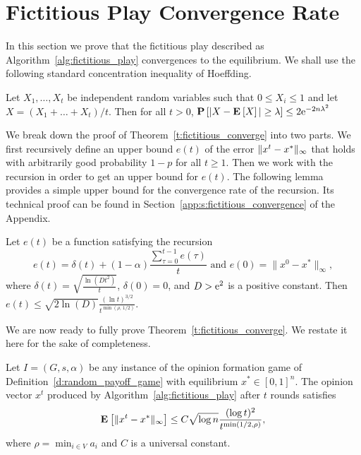 \section{Fictitious Play Convergence Rate}\label{s:fictitious_convergence}
In this section we prove that the fictitious play described as
Algorithm~\ref{alg:fictitious_play} convergences to the equilibrium.
We shall use the following standard concentration inequality of Hoeffding.
\begin{lemma}\label{l:hoeffding}
  Let $X_1, \ldots, X_t$ be independent random variables such that
  $0 \leq X_i \leq 1$ and let $X = (X_1 + \ldots + X_t) / t$. Then
  for all $t > 0$,
  \(
    \Prob{ |X - \Exp X| \geq \lambda} \leq 2 \me^{-2 n \lambda^2}
  \)
\end{lemma}
We break down the proof of Theorem~\ref{t:fictitious_converge}
into two parts.  We first recursively define an upper bound $e(t)$
of the error $\| x^t - x^* \|_{\infty}$ that holds with arbitrarily
good probability $1-p$ for all $t \geq 1$. Then we work
with the recursion in order to get an upper bound for $e(t)$.
The following lemma provides a simple upper bound for the
convergence rate of the recursion. Its technical proof can
be found in Section~\ref{app:s:fictitious_convergence} of the Appendix.
\begin{lemma}\label{l:recursion_upper_bound}
  Let $e(t)$ be a function satisfying the recursion
  \[
    e(t) =
    \delta(t) + (1-\alpha)\frac{\sum_{\tau=0}^{t-1}e(\tau)}{t}
    \text{ and } e(0)=\|x^0 - x^*\|_{\infty},
  \]
  where \(\delta(t) = \sqrt{\frac{\ln(D t^2)}{t}} \), \(\delta(0) = 0 \),
  and $D > \mathrm{e}^2$ is a positive constant.  Then
  \(
    e(t) \leq
    \sqrt{2 \ln(D)} \frac{(\ln t)^{3/2}}{t^{\min(\rho,\, 1/2)}}.
  \)
\end{lemma}
We are now ready to fully prove Theorem~\ref{t:fictitious_converge}.
We restate it here for the sake of completeness.
\begin{theorem}
  Let $I = (G,s, \alpha)$ be any instance of the opinion formation
  game of Definition~\ref{d:random_payoff_game} with equilibrium
  $x^* \in [0,1]^n$.  The opinion vector $x^t$ produced by
  Algorithm~\ref{alg:fictitious_play} after $t$ rounds satisfies
  \[
    \bm{\mathrm{E}}_{} \left[ \| x^t - x^* \|_{\infty} \right] \leq
    C \sqrt{\log n}\frac{(\log t)^{2}}{t^{\min(1/2,\rho)}},
  \]
  where $\rho = \min_{i \in V} a_i$ and $C$ is a universal constant.
\end{theorem}
